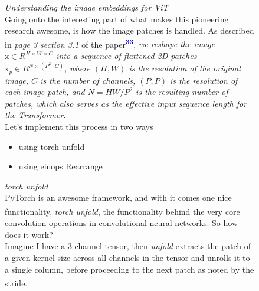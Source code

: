 \documentclass[12pt]{article}
\newcommand{\customtext}[3]{%
    \vspace{#2} %
    \fontsize{13}{8}\textcolor{#1}{\textit{#3}}%
}
\newcommand{\sidecite}[1]{\textsuperscript{\textcolor{blue}{\textbf{\scriptsize#1}}}}
\newcommand{\customtitle}[1]{\fontsize{14}{8}\textcolor{xtitle}{\textit{#1}}\\}
\newcommand{\maincitecount}{\sidecite{\stepcounter{maincite}\themaincite}}
\begin{document}
\begin{figure}[!htb]
    \begin{minipage}[t]{0.65\textwidth}
    \raggedright
    \customtext{xtitle}{0em}{Understanding the image embeddings for ViT}\\
    Going onto the interesting part of what makes this pioneering research awesome, 
    is how the image patches is handled.
    As described in {\it page 3 section 3.1} of the paper\sidecite{33},
    {\it\small we reshape the image $\text{x}\in R^{H\times W\times C}$ into a 
    sequence of flattened 2D patches $\text{x}_p\in R^{N\times (P^2\cdot C)}$,
    where $(H,W)$ is the resolution of the original image, $C$ is the number 
    of channels, $(P,P)$ is the resolution of each image patch, and $N = HW/P^2$ 
    is the resulting number of patches, which also serves as the effective 
    input sequence length for the Transformer.}
    \vspace{0.5em}\\
    Let's implement this process in two ways
    \begin{itemize}[left=0pt,topsep=0pt,itemsep=-1ex,parsep=0ex]
        \item using torch unfold
        \item using einops Rearrange
      \end{itemize}
      \vspace{1em}
      \customtitle{torch unfold}
      PyTorch is an awesome framework, and with it comes one nice functionality, 
      {\it torch unfold}{\maincitecount}, the functionality behind the very core 
      convolution operations in convolutional neural networks. So how does it work?\\
      Imagine I have a 3-channel tensor, then {\it unfold} extracts the patch of a given 
      kernel size across all channels in the tensor and unrolls it to a single column, 
      before proceeding to the next patch as noted by the stride\maincitecount.
\begin{figure}[H]
\end{figure}
\end{minipage}
\end{figure}
\end{document}
